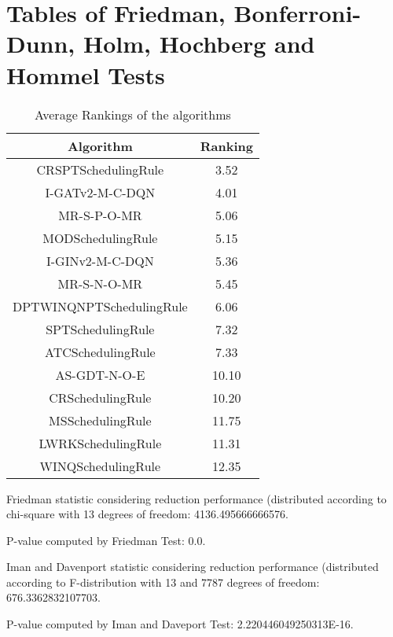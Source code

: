 \documentclass[a3paper,10pt]{article}
\author{}
\date{\today}
\begin{document}
\oddsidemargin 0in \topmargin 0in\maketitle
\section{Tables of Friedman, Bonferroni-Dunn, Holm, Hochberg and Hommel Tests}
\begin{table}[!htp]
\centering
\caption{Average Rankings of the algorithms
}\begin{tabular}{c|c}
Algorithm&Ranking\\
\hline
CRSPTSchedulingRule&3.52\\
I-GATv2-M-C-DQN&4.01\\
MR-S-P-O-MR&5.06\\
MODSchedulingRule&5.15\\
I-GINv2-M-C-DQN&5.36\\
MR-S-N-O-MR&5.45\\
DPTWINQNPTSchedulingRule&6.06\\
SPTSchedulingRule&7.32\\
ATCSchedulingRule&7.33\\
AS-GDT-N-O-E&10.10\\
CRSchedulingRule&10.20\\
MSSchedulingRule&11.75\\
LWRKSchedulingRule&11.31\\
WINQSchedulingRule&12.35\\
\end{tabular}
\end{table}


Friedman statistic considering reduction performance (distributed according to chi-square with 13 degrees of freedom: 4136.495666666576.


P-value computed by Friedman Test: 0.0.\newline

Iman and Davenport statistic considering reduction performance (distributed according to F-distribution with 13 and 7787 degrees of freedom: 676.3362832107703.


P-value computed by Iman and Daveport Test: 2.220446049250313E-16.\newline
\end{document}
